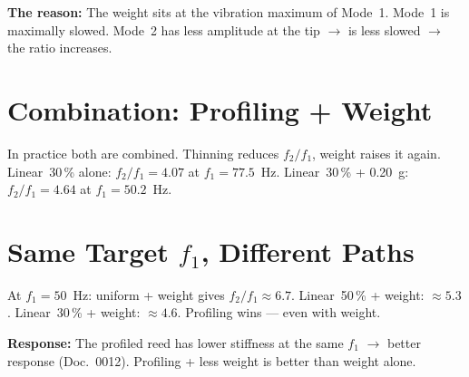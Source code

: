 \documentclass[11pt,a4paper]{article}
\begin{document}
\begin{center}
\end{center}

\begin{tcolorbox}[colframe=keygreen, colback=green!5!white]
\textbf{The reason:} The weight sits at the vibration maximum of Mode~1.
Mode~1 is maximally slowed. Mode~2 has less amplitude at the tip
$\to$ is less slowed $\to$ the ratio increases.
\end{tcolorbox}

\section{Combination: Profiling + Weight}

In practice both are combined. Thinning reduces $f_2/f_1$,
weight raises it again. Linear~30\,\% alone: $f_2/f_1 = 4{.}07$
at $f_1 = 77{.}5$~Hz. Linear~30\,\% + 0.20~g: $f_2/f_1 = 4{.}64$
at $f_1 = 50{.}2$~Hz.

\section{Same Target $f_1$, Different Paths}

At $f_1 = 50$~Hz: uniform + weight gives $f_2/f_1 \approx 6{.}7$.
Linear~50\,\% + weight: $\approx 5{.}3$. Linear~30\,\% + weight:
$\approx 4{.}6$. Profiling wins --- even with weight.

\begin{tcolorbox}[colframe=keygreen, colback=green!5!white]
\textbf{Response:} The profiled reed has lower stiffness at the same $f_1$
$\to$ better response (Doc.~0012).
Profiling + less weight is better than weight alone.
\end{tcolorbox}
\end{document}

